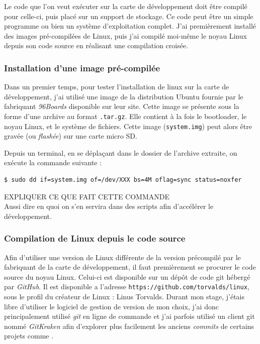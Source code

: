 Le code que l'on veut exécuter sur la carte de développement doit être compilé pour celle-ci, puis placé sur un support de stockage. Ce code peut être un simple programme ou bien un système d'exploitation complet. J'ai premièrement installé des images pré-compilées de Linux, puis j'ai compilé moi-même le noyau Linux depuis son code source en réalisant une compilation croisée.

\subsubsection{Installation d'une image pré-compilée}

Dans un premier temps, pour tester l'installation de linux sur la carte de développement, j'ai utilisé une image de la distribution Ubuntu fournie par le fabriquant \textit{96Boards} disponible sur leur site. Cette image se présente sous la forme d'une archive au format \texttt{.tar.gz}. Elle contient à la fois le \gls{bootloader}, le noyau Linux, et le système de fichiers. Cette image (\texttt{system.img}) peut alors être gravée (ou \textit{flashée}) sur une carte micro SD. 

Depuis un terminal, en se déplaçant dans le dossier de l'archive extraite, on exécute la commande suivante : 
\begin{lstlisting}[style=command, caption=Téléversement de l'image sur la carte microSD]
$ sudo dd if=system.img of=/dev/XXX bs=4M oflag=sync status=noxfer
\end{lstlisting}

\begin{center}
    \color{red}
    EXPLIQUER CE QUE FAIT CETTE COMMANDE \\
    Aussi dire en quoi on s'en servira dans des scripts afin d'accélérer le développement.
\end{center}


\subsubsection{Compilation de Linux depuis le code source}\label{sec:compilation-linux-source}

Afin d'utiliser une version de Linux différente de la version précompilé par le fabriquant de la carte de développement, il faut premièrement se procurer le code source du noyau Linux. Celui-ci est disponible sur un dépôt de code \gls{git} hébergé par \textit{GitHub}. Il est disponible a l'adresse \texttt{https://github.com/torvalds/linux}, sous le profil du créateur de Linux : Linus Torvalds. Durant mon stage, j'étais libre d'utiliser le logiciel de gestion de version de mon choix, j'ai donc principalement utilisé \textit{git} en ligne de commande et j'ai parfois utilisé un client git nommé \textit{GitKraken} afin d'explorer plus facilement les anciens \textit{commits} de certains projets comme \litmus.

